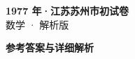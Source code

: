\documentclass[zihao=-4, a4paper]{ctexart}
\begin{document}
\begin{center}
  {\Large\bfseries 1977 年·江苏苏州市初试卷}\\[4pt]
  {\large 数学 · 解析版}
\end{center}
\medskip
{}

\clearpage
{}
\begin{center}{\Large\bfseries 参考答案与详细解析}\end{center}
\medskip

\end{document}

